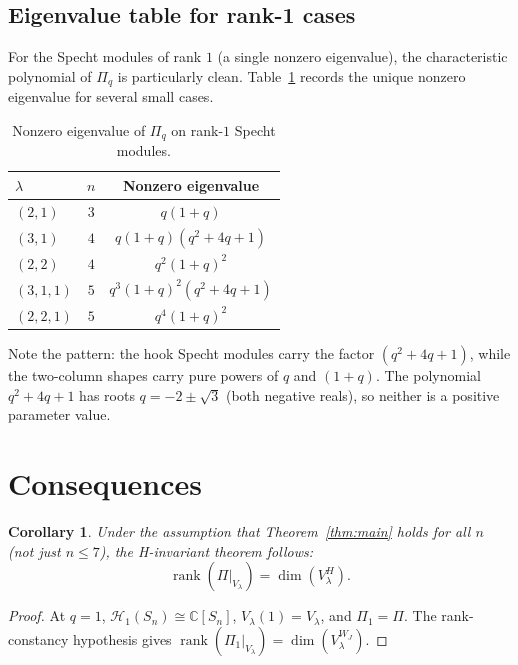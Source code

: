 \documentclass[12pt]{article}
\newtheorem{corollary}[theorem]{Corollary}
\theoremstyle{remark}
\theoremstyle{definition}
\begin{document}
\subsection{Eigenvalue table for rank-1 cases}

For the Specht modules of rank $1$ (a single nonzero eigenvalue), the characteristic polynomial
of $\Pi_q$ is particularly clean.  Table~\ref{tab:eigenvalues} records the unique nonzero
eigenvalue for several small cases.

\begin{table}[h]
\centering
\caption{Nonzero eigenvalue of $\Pi_q$ on rank-$1$ Specht modules.}
\label{tab:eigenvalues}
\begin{tabular}{@{}lcc@{}}
\toprule
$\lambda$ & $n$ & Nonzero eigenvalue \\
\midrule
$(2,1)$     & $3$ & $q(1+q)$ \\
$(3,1)$     & $4$ & $q(1+q)(q^2+4q+1)$ \\
$(2,2)$     & $4$ & $q^2(1+q)^2$ \\
$(3,1,1)$   & $5$ & $q^3(1+q)^2(q^2+4q+1)$ \\
$(2,2,1)$   & $5$ & $q^4(1+q)^2$ \\
\bottomrule
\end{tabular}
\end{table}

Note the pattern: the hook Specht modules carry the factor $(q^2 + 4q + 1)$, while the
two-column shapes carry pure powers of $q$ and $(1+q)$.  The polynomial $q^2+4q+1$ has
roots $q = -2 \pm \sqrt{3}$ (both negative reals), so neither is a positive parameter value.

\section{Consequences}

\begin{corollary}
\label{cor:q1}
Under the assumption that Theorem~\ref{thm:main} holds for all $n$ (not just $n \leq 7$),
the H-invariant theorem follows:
\[
  \operatorname{rank}(\Pi|_{V_\lambda}) = \dim(V_\lambda^H).
\]
\end{corollary}

\begin{proof}
At $q = 1$, $\mathcal{H}_1(S_n) \cong \mathbb{C}[S_n]$, $V_\lambda(1) = V_\lambda$, and
$\Pi_1 = \Pi$.  The rank-constancy hypothesis gives
$\operatorname{rank}(\Pi_1|_{V_\lambda}) = \dim(V_\lambda^{W_J})$.
\end{proof}
\end{document}
